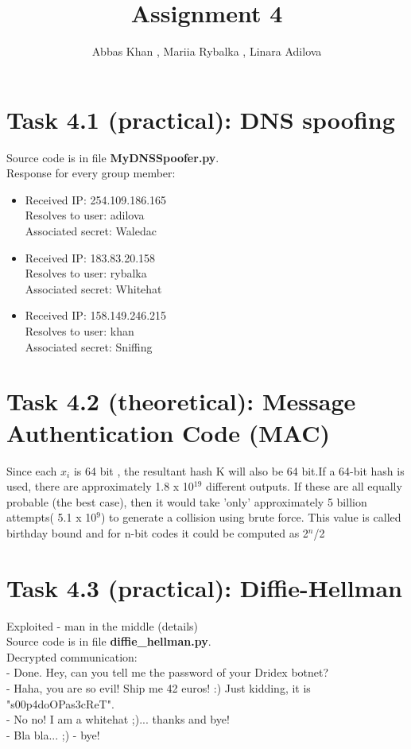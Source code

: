 \documentclass{article}
\title{Assignment 4}
\author{Abbas Khan , Mariia Rybalka , Linara Adilova}
\begin{document}
\maketitle 
    
\section*{Task 4.1 (practical): DNS spoofing}
Source code is in file \textbf{MyDNSSpoofer.py}.
\\
Response for every group member:
\begin{itemize}
\item
Received IP: 254.109.186.165
\\Resolves to user: adilova
\\Associated secret: Waledac
\item 
Received IP: 183.83.20.158
\\Resolves to user: rybalka
\\Associated secret: Whitehat
\item
Received IP: 158.149.246.215
\\Resolves to user: khan
\\Associated secret: Sniffing
\end{itemize}


\section*{Task 4.2 (theoretical): Message Authentication Code (MAC)}
Since each $x_{i}$ is 64 bit , the resultant hash K will also be 64 bit.If a 64-bit hash is used, there are approximately 1.8 x 10$^{19}$ different outputs. If these are all equally probable (the best case), then it would take 'only' approximately 5 billion attempts( 5.1 x 10$^{9}$) to generate a collision using brute force. This value is called birthday bound and for n-bit codes it could be computed as 2$^{n}$/2\cite{birthday_attack}
\section*{Task 4.3 (practical): Diffie-Hellman}
Exploited - man in the middle (details)
\\
Source code is in file \textbf{diffie\_hellman.py}.
\\
Decrypted communication:
\\- Done. Hey, can you tell me the password of your Dridex botnet?
\\- Haha, you are so evil! Ship me 42 euros! :) Just kidding, it is "s00p4doOPas3cReT".
\\- No no! I am a whitehat ;)... thanks and bye!
\\- Bla bla... ;) - bye!
\end{document}
